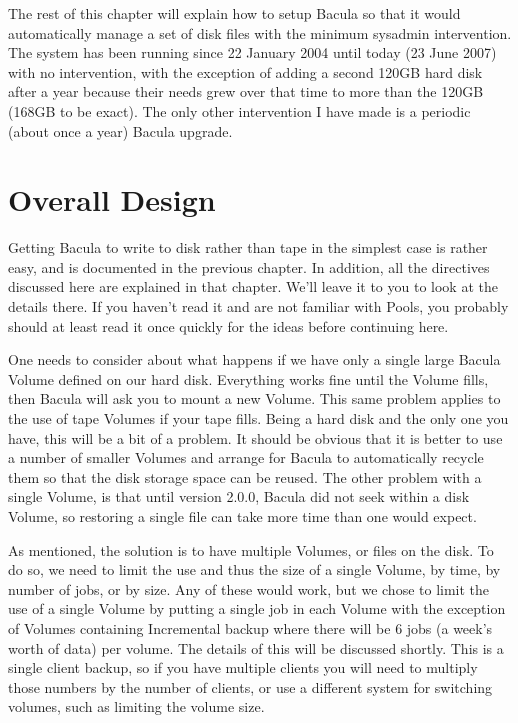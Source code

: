 The rest of this chapter will explain how to setup Bacula so that it would
automatically manage a set of disk files with the minimum sysadmin
intervention. The system has been running since 22 January 2004 until today
(23 June 2007) with no intervention, with the exception of adding 
a second 120GB hard disk after a year because their needs grew
over that time to more than the 120GB (168GB to be exact).  The only other
intervention I have made is a periodic (about once a year) Bacula upgrade.

\label{OverallDesign}
\section{Overall Design}

Getting Bacula to write to disk rather than tape in the simplest case is
rather easy, and is documented in the previous chapter. In addition, all the
directives discussed here are explained in that chapter. We'll leave it to you
to look at the details there. If you haven't read it and are not familiar with
Pools, you probably should at least read it once quickly for the ideas before
continuing here. 

One needs to consider about what happens if we have only a single large Bacula
Volume defined on our hard disk. Everything works fine until the Volume fills,
then Bacula will ask you to mount a new Volume. This same problem applies to
the use of tape Volumes if your tape fills. Being a hard disk and the only one
you have, this will be a bit of a problem. It should be obvious that it is
better to use a number of smaller Volumes and arrange for Bacula to
automatically recycle them so that the disk storage space can be reused. The
other problem with a single Volume, is that until version 2.0.0,
Bacula did not seek within a disk Volume, so restoring a single file can take
more time than one would expect. 

As mentioned, the solution is to have multiple Volumes, or files on the disk.
To do so, we need to limit the use and thus the size of a single Volume, by
time, by number of jobs, or by size. Any of these would work, but we chose to
limit the use of a single Volume by putting a single job in each Volume with
the exception of Volumes containing Incremental backup where there will be 6
jobs (a week's worth of data) per volume. The details of this will be
discussed shortly.  This is a single client backup, so if you have multiple
clients you will need to multiply those numbers by the number of clients,
or use a different system for switching volumes, such as limiting the
volume size.


